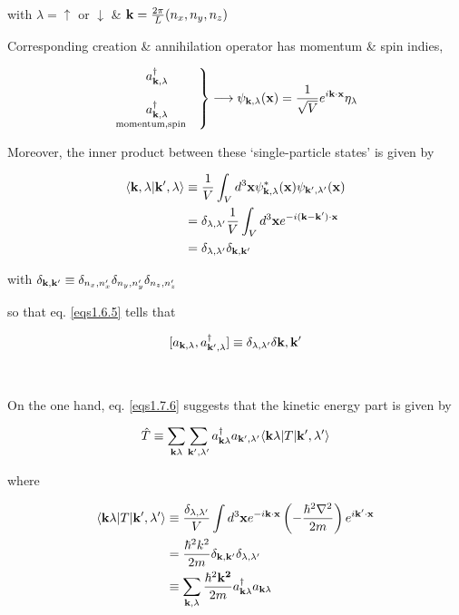 with $\lambda=\uparrow$ or $\downarrow$ \& ${\bf k}=\frac{2\pi}{L}(n_x,n_y,n_z)$

Corresponding creation \& annihilation operator has momentum \& spin indies, 

\[
\left.\begin{matrix}
a^\dagger_{{\bf k},\lambda} \\
\ \\
\underset{\text{momentum,spin}\quad}{a^\dagger_{{\bf k},{\lambda}}}
\end{matrix}\right\}\longrightarrow\psi_{{\bf k},\lambda}({\bf x})=\frac{1}{\sqrt{V}}e^{i\bf k\cdot x}\eta_\lambda 
\]

Moreover, the inner product between these `single-particle states' is given by

\[\begin{split}
\langle {\bf k},\lambda|{\bf k'},\lambda\rangle&\equiv\frac{1}{V}\int_V d^3{\bf x}\psi_{{\bf k},\lambda}^*({\bf x})\psi_{{\bf k'},\lambda'}({\bf x}) \\
&=\delta_{\lambda,\lambda'}\frac{1}{V}\int_V d^3{\bf x}e^{-i\bf (k-k')\cdot x}\\
&=\delta_{\lambda,\lambda'}\delta_{\bf k,k'}
\end{split}\]

with $\delta_{\bf k,k'}\equiv\delta_{n_x,n_x'}\delta_{n_y,n_y'}\delta_{n_z,n_z'}$

so that eq. \eqref{eqs1.6.5} tells that

\[[a_{{\bf k},\lambda},a^\dagger_{{\bf k'},\lambda}]\equiv\delta_{\lambda,\lambda'}\delta{\bf k,k'} \]

\dotfill

\ 

On the one hand, eq. \eqref{eqs1.7.6} suggests that the kinetic energy part is given by

\[\hat{T}\equiv\sum_{{\bf k}\lambda}\sum_{{\bf k'},\lambda'}a^\dagger_{{\bf k}\lambda} a_{{\bf k'},\lambda'}\langle{\bf k}\lambda|T|{\bf k'},\lambda'\rangle\]

where

\begin{align}\label{eq1.8.11}
\begin{split}
\langle{\bf k}\lambda|T|{\bf k'},\lambda'\rangle&\equiv\frac{\delta_{\lambda,\lambda'}}{V}\int d^3{\bf x}e^{-i\bf k\cdot x}\left(-\frac{\hbar^2\nabla^2}{2m}\right)e^{i\bf k'\cdot x}\\
&=\frac{\hbar^2 k^2}{2m}\delta_{\bf k,k'}\delta_{\lambda,\lambda'}\\
&\equiv\sum_{{\bf k},\lambda}\frac{\hbar^2\bf k^2}{2m}a^\dagger_{{\bf k}\lambda}a_{{\bf k}\lambda}
\end{split}
\end{align}

